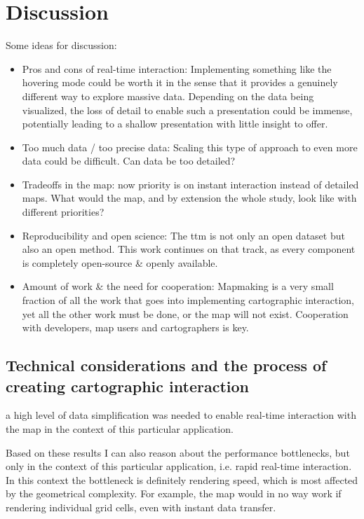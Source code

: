 \section{Discussion}

Some ideas for discussion:
\begin{itemize}
	\item Pros and cons of real-time interaction:
	Implementing something like the hovering mode could be worth it in the sense
	that it provides a genuinely different way to explore massive data.
	Depending on the data being visualized,
	the loss of detail to enable such a presentation could be immense,
	potentially leading to a shallow presentation with little insight to offer.
	\item Too much data / too precise data:
	Scaling this type of approach to even more data could be difficult. Can data be too detailed?
	\item Tradeoffs in the map:
	now priority is on instant interaction instead of detailed maps.
	What would the map, and by extension the whole study, look like with different priorities?
	\item Reproducibility and open science:
	The \acrshort{ttm} is not only an open dataset but also an open method.
	This work continues on that track,
	as every component is completely open-source \& openly available.
	\item Amount of work \& the need for cooperation:
	Mapmaking is a very small fraction of all the work that goes into implementing cartographic interaction,
	yet all the other work must be done, or the map will not exist.
	Cooperation with developers, map users and cartographers is key.
\end{itemize}

\subsection{Technical considerations and the process of creating cartographic interaction}

a high level of data simplification was needed to enable real-time interaction with the map
in the context of this particular application.



Based on these results
I can also reason about the performance bottlenecks,
but only in the context of this particular application, i.e. rapid real-time interaction.
In this context the bottleneck is definitely rendering speed,
which is most affected by the geometrical complexity.
For example, the map would in no way work if rendering individual grid cells,
even with instant data transfer.

